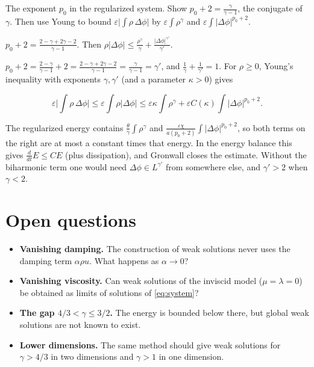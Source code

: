 \begin{exercise}
  The exponent $p_0$ in the regularized system. Show $p_0 + 2 = \frac{\gamma}{\gamma-1}$, the conjugate of $\gamma$. Then use Young to bound $\varepsilon\big|\int\rho\,\Delta\phi\big|$ by $\varepsilon\int\rho^\gamma$ and $\varepsilon\int|\Delta\phi|^{p_0+2}$.
  \begin{hint}
    $p_0 + 2 = \frac{2-\gamma+2\gamma-2}{\gamma-1}$. Then $\rho|\Delta\phi| \le \frac{\rho^\gamma}{\gamma} + \frac{|\Delta\phi|^{\gamma'}}{\gamma'}$.
  \end{hint}
  \begin{solution}
    $p_0 + 2 = \frac{2-\gamma}{\gamma-1} + 2 = \frac{2 - \gamma + 2\gamma - 2}{\gamma-1} = \frac{\gamma}{\gamma-1} = \gamma'$, and $\frac1\gamma + \frac1{\gamma'} = 1$. For $\rho \ge 0$, Young's inequality with exponents $\gamma, \gamma'$ (and a parameter $\kappa > 0$) gives

    \[ \varepsilon\Big|\int\rho\,\Delta\phi\Big| \le \varepsilon\int\rho|\Delta\phi| \le \varepsilon\kappa\int\rho^\gamma + \varepsilon C(\kappa)\int|\Delta\phi|^{p_0+2}. \]

    The regularized energy contains $\frac\theta\gamma\int\rho^\gamma$ and $\frac{\varepsilon\chi}{a(p_0+2)}\int|\Delta\phi|^{p_0+2}$, so both terms on the right are at most a constant times that energy. In the energy balance this gives $\frac{d}{dt}E \le CE$ (plus dissipation), and Gronwall closes the estimate. Without the biharmonic term one would need $\Delta\phi \in L^{\gamma'}$ from somewhere else, and $\gamma' > 2$ when $\gamma < 2$.
  \end{solution}
\end{exercise}

\section{Open questions}

\begin{itemize}
\item \textbf{Vanishing damping.} The construction of weak solutions never uses the damping term $\alpha\rho u$. What happens as $\alpha \to 0$?
\item \textbf{Vanishing viscosity.} Can weak solutions of the inviscid model ($\mu = \lambda = 0$) be obtained as limits of solutions of \eqref{eq:system}?
\item \textbf{The gap $4/3 < \gamma \le 3/2$.} The energy is bounded below there, but global weak solutions are not known to exist.
\item \textbf{Lower dimensions.} The same method should give weak solutions for $\gamma > 4/3$ in two dimensions and $\gamma > 1$ in one dimension.
\end{itemize}

